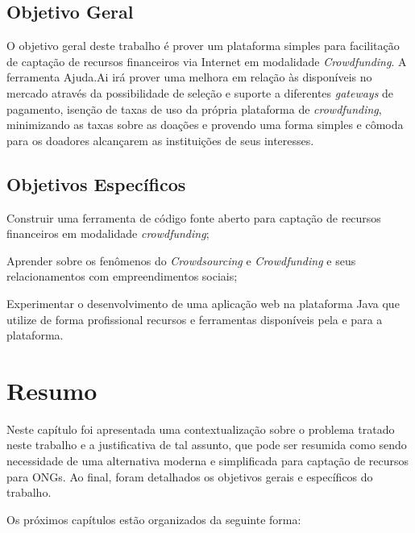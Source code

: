 \subsection{Objetivo Geral}
O objetivo geral deste trabalho é prover um plataforma simples para facilitação de captação de recursos financeiros via Internet em modalidade \emph{Crowdfunding}. A ferramenta Ajuda.Ai irá prover uma melhora em relação às disponíveis no mercado através da possibilidade de seleção e suporte a diferentes \emph{gateways} de pagamento, isenção de taxas de uso da própria plataforma de \emph{crowdfunding}, minimizando as taxas sobre as doações e provendo uma forma simples e cômoda para os doadores alcançarem as instituições de seus interesses.



\subsection{Objetivos Específicos}
\begin{lista}
  \item Construir uma ferramenta de código fonte aberto para captação de recursos financeiros em modalidade \emph{crowdfunding};
  \item Aprender sobre os fenômenos do \emph{Crowdsourcing} e \emph{Crowdfunding} e seus relacionamentos com empreendimentos sociais;
  \item Experimentar o desenvolvimento de uma aplicação web na plataforma Java que utilize de forma profissional recursos e ferramentas disponíveis pela e para a plataforma.
\end{lista}



\section*{Resumo}
Neste capítulo foi apresentada uma contextualização sobre o problema tratado neste trabalho e a justificativa de tal assunto, que pode ser resumida como sendo necessidade de uma alternativa moderna e simplificada para captação de recursos para ONGs. Ao final, foram detalhados os objetivos gerais e específicos do trabalho.

Os próximos capítulos estão organizados da seguinte forma:

